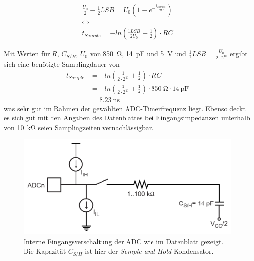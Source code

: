 		\begin{gather}
			\frac{U_0}{2} - \frac{1}{2}LSB = U_0 \left( 1 - e^{-\frac{t_{Sample}}{RC}} \right) \nonumber \\
			\Leftrightarrow \nonumber \\
			t_{Sample} = -ln\left( \frac{1LSB}{2U_0} + \frac{1}{2}\right) \cdot RC
			\label{eq:samplingzeit}
		\end{gather}

		Mit Werten für \(R\), \(C_{S/H}\), \(U_0\) von \SI{850}{\ohm}, \SI{14}{\pico\farad} und \SI{5}{\volt} und \(\frac{1}{2}LSB = \frac{U_0}{2 \cdot 2^{10}}\) ergibt sich eine benötigte Samplingdauer von
		\begin{align}
			t_{Sample}	&= -ln\left( \frac{1}{2\cdot 2^{10}} + \frac{1}{2}\right) \cdot RC \nonumber \\
						&= -ln\left( \frac{1}{2\cdot 2^{10}} + \frac{1}{2}\right) \cdot \SI{850}{\ohm} \cdot \SI{14}{\pico\farad} \nonumber \\
						&= \SI{8,23}{\nano\second}
			\label{eq:samplingzeit gerechnet}
		\end{align}
		was sehr gut im Rahmen der gewählten ADC-Timerfrequenz liegt.
		Ebenso deckt es sich gut mit den Angaben des Datenblattes bei Eingangsimpedanzen unterhalb von \SI{10}{\kilo\ohm} seien Samplingzeiten vernachlässigbar.
		\begin{figure}[h]
			\centering
			\includegraphics[width=.8\textwidth]{fig/adc-input-circuit.png}
			\caption[Interne Eingangsverschaltung der ADC]{Interne Eingangsverschaltung der ADC wie im Datenblatt gezeigt. Die Kapazität \(C_{S/H}\) ist hier der \textit{Sample and Hold}-Kondensator.}
			\label{fig:analog input circuitry}
		\end{figure}
